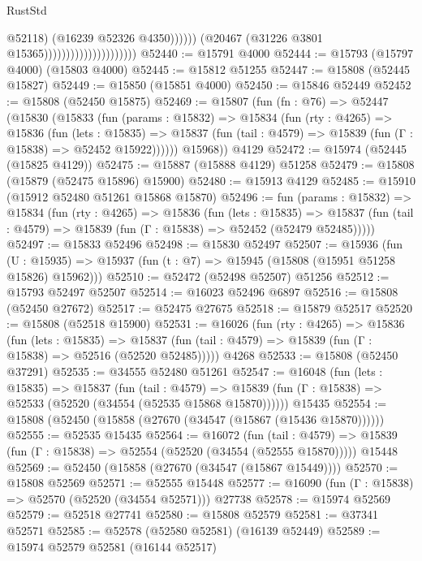 \begin{lexlean}{RustStd}
\begin{coremodule}
                                                      @52118)
                                                    (@16239 @52326 @4350))))))
                                          (@20467 (@31226 @3801 @15365)))))))))))))))))))))
@52440 := @15791 @4000
@52444 := @15793 (@15797 @4000) (@15803 @4000)
@52445 := @15812 @51255
@52447 := @15808 (@52445 @15827)
@52449 := @15850 (@15851 @4000)
@52450 := @15846 @52449
@52452 := @15808 (@52450 @15875)
@52469 := @15807
    (fun (fn : @76) =>
    @52447
      (@15830
        (@15833
          (fun (params : @15832) =>
          @15834
            (fun (rty : @4265) =>
            @15836
              (fun (lets : @15835) =>
              @15837 (fun (tail : @4579) => @15839 (fun (Γ : @15838) => @52452 @15922))))))
        @15968))
    @4129
@52472 := @15974 (@52445 (@15825 @4129))
@52475 := @15887 (@15888 @4129) @51258
@52479 := @15808 (@15879 (@52475 @15896) @15900)
@52480 := @15913 @4129
@52485 := @15910 (@15912 @52480 @51261 @15868 @15870)
@52496 := fun (params : @15832) =>
  @15834
    (fun (rty : @4265) =>
    @15836
      (fun (lets : @15835) =>
      @15837 (fun (tail : @4579) => @15839 (fun (Γ : @15838) => @52452 (@52479 @52485)))))
@52497 := @15833 @52496
@52498 := @15830 @52497
@52507 := @15936
    (fun (U : @15935) => @15937 (fun (t : @7) => @15945 (@15808 (@15951 @51258 @15826) @15962)))
@52510 := @52472 (@52498 @52507) @51256
@52512 := @15793 @52497 @52507
@52514 := @16023 @52496 @6897
@52516 := @15808 (@52450 @27672)
@52517 := @52475 @27675
@52518 := @15879 @52517
@52520 := @15808 (@52518 @15900)
@52531 := @16026
    (fun (rty : @4265) =>
    @15836
      (fun (lets : @15835) =>
      @15837 (fun (tail : @4579) => @15839 (fun (Γ : @15838) => @52516 (@52520 @52485)))))
    @4268
@52533 := @15808 (@52450 @37291)
@52535 := @34555 @52480 @51261
@52547 := @16048
    (fun (lets : @15835) =>
    @15837
      (fun (tail : @4579) =>
      @15839 (fun (Γ : @15838) => @52533 (@52520 (@34554 (@52535 @15868 @15870))))))
    @15435
@52554 := @15808 (@52450 (@15858 (@27670 (@34547 (@15867 (@15436 @15870))))))
@52555 := @52535 @15435
@52564 := @16072
    (fun (tail : @4579) => @15839 (fun (Γ : @15838) => @52554 (@52520 (@34554 (@52555 @15870)))))
    @15448
@52569 := @52450 (@15858 (@27670 (@34547 (@15867 @15449))))
@52570 := @15808 @52569
@52571 := @52555 @15448
@52577 := @16090 (fun (Γ : @15838) => @52570 (@52520 (@34554 @52571))) @27738
@52578 := @15974 @52569
@52579 := @52518 @27741
@52580 := @15808 @52579
@52581 := @37341 @52571
@52585 := @52578 (@52580 @52581) (@16139 @52449)
@52589 := @15974 @52579 @52581 (@16144 @52517)

\end{coremodule}
\end{lexlean}
